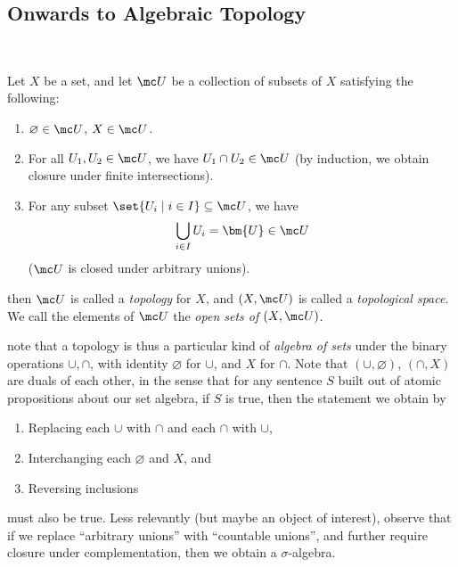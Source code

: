 \documentclass[nocover]{pset}
\begin{document}
\begin{adjustwidth}{1em}{1em}
  \subsection{Onwards to Algebraic Topology}~
  \vspace{-.75em}
  \begin{definition}
    Let $X$ be a set, and let $\mc U$ be a collection of subsets of
    $X$ satisfying the following:
    \begin{enumerate}[label=(\roman*)]
      \item $\varnothing \in \mc U$, $X \in \mc U$.
      \item For all $U_1, U_2 \in \mc U$, we have $U_1 \cap U_2 \in
        \mc U$ (by induction, we obtain closure under finite
        intersections).
      \item For any subset $\set{U_i \mid i \in I} \subseteq \mc U$,
        we have
        \[
          \bigcup_{i \in I} U_i = \bm{U} \in \mc U
        \]
        ($\mc U$ is closed under arbitrary unions).
    \end{enumerate}
    then $\mc U$ is called a \emph{topology} for $X$, and $(X, \mc U)$
    is called a \emph{topological space}. We call the elements of $\mc
    U$ the \emph{open sets of} $(X, \mc U)$.
  \end{definition}
  note that a topology is thus a particular kind of \emph{algebra of
    sets} under the binary operations $\cup, \cap$, with identity
  $\varnothing$ for $\cup$, and $X$ for $\cap$. Note that $(\cup,
  \varnothing)$, $(\cap, X)$ are duals of each other, in the sense
  that for any sentence $S$ built out of atomic propositions about our
  set algebra, if $S$ is true, then the statement we obtain by
  \begin{enumerate}[label=\arabic*.]
    \item Replacing each $\cup$ with $\cap$ and each $\cap$ with
      $\cup$,
    \item Interchanging each $\varnothing$ and $X$, and
    \item Reversing inclusions
  \end{enumerate}
  must also be true. Less relevantly (but maybe an object of
  interest), observe that if we replace ``arbitrary unions'' with
  ``countable unions'', and further require closure under
  complementation, then we obtain a $\sigma$-algebra.


\end{adjustwidth}
\end{document}
